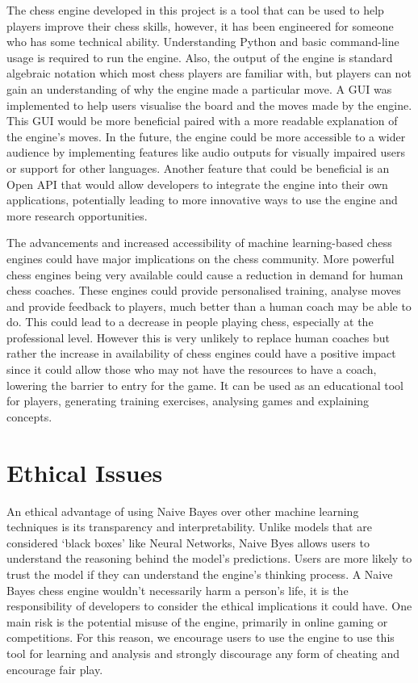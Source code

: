The chess engine developed in this project is a tool that can be used to help players improve their chess skills, however, it has been engineered for someone who has some technical ability. Understanding Python and basic command-line usage is required to run the engine. Also, the output of the engine is standard algebraic notation which most chess players are familiar with, but players can not gain an understanding of why the engine made a particular move. A GUI was implemented to help users visualise the board and the moves made by the engine. This GUI would be more beneficial paired with a more readable explanation of the engine's moves. In the future, the engine could be more accessible to a wider audience by implementing features like audio outputs for visually impaired users or support for other languages. Another feature that could be beneficial is an Open API that would allow developers to integrate the engine into their own applications, potentially leading to more innovative ways to use the engine and more research opportunities. 

The advancements and increased accessibility of machine learning-based chess engines could have major implications on the chess community. More powerful chess engines being very available could cause a reduction in demand for human chess coaches. These engines could provide personalised training, analyse moves and provide feedback to players, much better than a human coach may be able to do. This could lead to a decrease in people playing chess, especially at the professional level. However this is very unlikely to replace human coaches but rather the increase in availability of chess engines could have a positive impact since it could allow those who may not have the resources to have a coach, lowering the barrier to entry for the game. It can be used as an educational tool for players, generating training exercises, analysing games and explaining concepts.

\section{Ethical Issues}

An ethical advantage of using Naive Bayes over other machine learning techniques is its transparency and interpretability. Unlike models that are considered `black boxes' like Neural Networks, Naive Byes allows users to understand the reasoning behind the model's predictions. Users are more likely to trust the model if they can understand the engine's thinking process. A Naive Bayes chess engine wouldn't necessarily harm a person's life, it is the responsibility of developers to consider the ethical implications it could have. One main risk is the potential misuse of the engine, primarily in online gaming or competitions. For this reason, we encourage users to use the engine to use this tool for learning and analysis and strongly discourage any form of cheating and encourage fair play.

